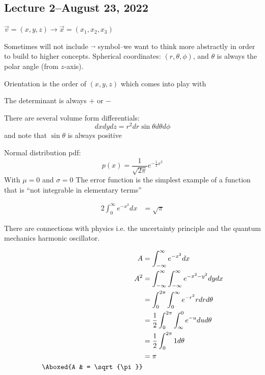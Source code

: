\documentclass{scrreprt}
\begin{document}
\subsection{Lecture 2--August 23, 2022}

\begin{definition}

	$\vec{v}=(x,y,z)\rightarrow \vec{x}=(x_1,x_2,x_3)$

	Sometimes will not include $\vec{}$ symbol--we want to think more abstractly in order to build to higher concepts.
	Spherical coordinates: $(r,\theta,\phi)$, and $\theta$ is always the polar angle (from $z$-axis).

	Orientation is the order of $(x, y, z)$ which comes into play with 

\end{definition}

\begin{remark}
	The determinant is always $+$ or $-$
\end{remark}

There are several volume form differentials:
\[
	dxdydz = r^2dr\sin \theta d\theta d\phi
\]
and note that $\sin \theta$ is always positive

\begin{remark}
	Normal distribution pdf: \[p(x)=\frac{1}{\sqrt{2\pi}}e^{-\frac{1}{2}x^2}\]
	With $\mu=0$ and $\sigma=0$
	The error function is the simplest example of a function that is ``not integrable in elementary terms''

	\begin{align*}
		2 \int_0^\infty e^{-x^2}dx & = \sqrt{\pi}
	\end{align*}

	There are connections with physics i.e. the uncertainty principle and the quantum mechanics harmonic oscillator.

	\begin{align*}
		A         & = \int_{-\infty}^{\infty} e^{-x^2}dx                                  \\
		A^2       & = \int_{-\infty}^{\infty} \int_{-\infty}^{\infty} e^{-x^2 - y^2} dydx \\
		          & = \int_{0}^{2\pi}\int_{0}^{\infty} e^{-r^2}rdrd\theta                 \\
		          & = \frac{1}{2}\int_{0}^{2\pi} \int_{\infty}^{0} e^{-u}dud\theta        \\
		          & = \frac{1}{2}\int_{0}^{2\pi} 1 d\theta                                \\
		          & = \pi                                                                 \\
		\Aboxed{A & = \sqrt{\pi}}
	\end{align*}
\end{remark}
\end{document}
